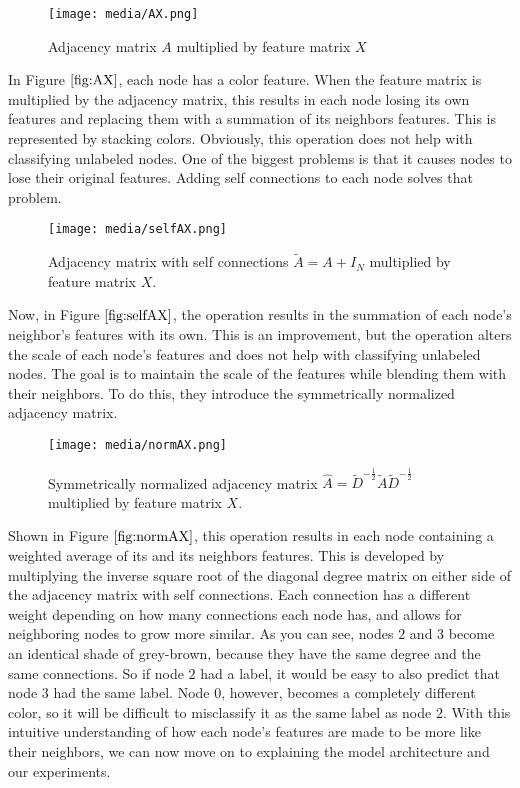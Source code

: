 \begin{figure}[h]
	\centering
	\texttt{[image: media/AX.png]}
	\caption{Adjacency matrix $A$ multiplied by feature matrix $X$} 
	\label{fig:AX}
\end{figure}


In Figure $\ref{fig:AX}$, each node has a color feature. When the feature matrix is multiplied by the adjacency matrix, this results in each node losing its own features and replacing them with a summation of its neighbors features. This is represented by stacking colors. Obviously, this operation does not help with classifying unlabeled nodes. One of the biggest problems is that it causes nodes to lose their original features. Adding self connections to each node solves that problem.


\begin{figure}[h]
	\centering
	\texttt{[image: media/selfAX.png]}
	\caption{Adjacency matrix with self connections $\tilde{A} = A + I_N$ multiplied by feature matrix $X$.} 
	\label{fig:selfAX}
\end{figure}


Now, in Figure $\ref{fig:selfAX}$, the operation results in the summation of each node's neighbor's features with its own. This is an improvement, but the operation alters the scale of each node's features and does not help with classifying unlabeled nodes. The goal is to maintain the scale of the features while blending them with their neighbors. To do this, they introduce the symmetrically normalized adjacency matrix.


\begin{figure}[h]
	\centering
	\texttt{[image: media/normAX.png]}
	\caption{Symmetrically normalized adjacency matrix $\hat{A} = \tilde{D}^{-\frac{1}{2}}\tilde{A}\tilde{D}^{-\frac{1}{2}}$ multiplied by feature matrix $X$.} 
	\label{fig:normAX}
\end{figure}


Shown in Figure $\ref{fig:normAX}$, this operation results in each node containing a weighted average of its and its neighbors features. This is developed by multiplying the inverse square root of the diagonal degree matrix on either side of the adjacency matrix with self connections. Each connection has a different weight depending on how many connections each node has, and allows for neighboring nodes to grow more similar. As you can see, nodes $2$ and $3$ become an identical shade of grey-brown, because they have the same degree and the same connections. So if node $2$ had a label, it would be easy to also predict that node $3$ had the same label. Node $0$, however, becomes a completely different color, so it will be difficult to misclassify it as the same label as node $2$. With this intuitive understanding of how each node's features are made to be more like their neighbors, we can now move on to explaining the model architecture and our experiments.
